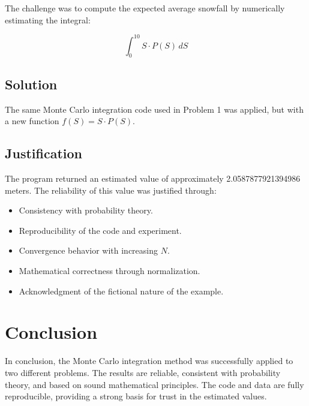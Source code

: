 \documentclass{article}
\begin{document}
The challenge was to compute the expected average snowfall by numerically estimating the integral:

\[ \int_0^{10} S \cdot P(S) \, dS \]

\subsection{Solution}

The same Monte Carlo integration code used in Problem 1 was applied, but with a new function $f(S) = S \cdot P(S)$.

\subsection{Justification}

The program returned an estimated value of approximately 2.0587877921394986 meters. The reliability of this value was justified through:
\begin{itemize}
\item Consistency with probability theory.
\item Reproducibility of the code and experiment.
\item Convergence behavior with increasing $N$.
\item Mathematical correctness through normalization.
\item Acknowledgment of the fictional nature of the example.
\end{itemize}

\section{Conclusion}

In conclusion, the Monte Carlo integration method was successfully applied to two different problems. The results are reliable, consistent with probability theory, and based on sound mathematical principles. The code and data are fully reproducible, providing a strong basis for trust in the estimated values.
\end{document}
